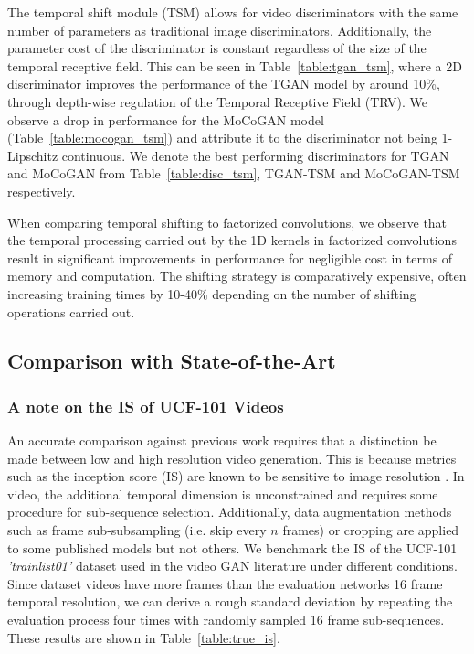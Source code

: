 \documentclass[a4paper,fleqn]{cas-sc}
\begin{document}
The temporal shift module (TSM) allows for video discriminators with the same number of parameters as traditional image discriminators. Additionally, the parameter cost of the discriminator is constant regardless of the size of the temporal receptive field. This can be seen in Table~\ref{table:tgan_tsm}, where a 2D discriminator improves the performance of the TGAN model by around 10\%, through depth-wise regulation of the Temporal Receptive Field (TRV). We observe a drop in performance for the MoCoGAN model (Table~\ref{table:mocogan_tsm}) and attribute it to the discriminator not being 1-Lipschitz continuous. We denote the best performing discriminators for TGAN and MoCoGAN from Table~\ref{table:disc_tsm}, TGAN-TSM and MoCoGAN-TSM respectively.

When comparing temporal shifting to factorized convolutions, we observe that the temporal processing carried out by the 1D kernels in factorized convolutions result in significant improvements in performance for negligible cost in terms of memory and computation. The shifting strategy is comparatively expensive, often increasing training times by 10-40\% depending on the number of shifting operations carried out.

\subsection{Comparison with State-of-the-Art}
\label{sec:sota}

\subsubsection{A note on the IS of UCF-101 Videos}
An accurate comparison against previous work requires that a distinction be made between low and high resolution video generation. This is because metrics such as the inception score (IS) are known to be sensitive to image resolution \cite{brockDS2018large,BORJI201941}. In video, the additional temporal dimension is unconstrained and requires some procedure for sub-sequence selection. Additionally, data augmentation methods such as frame sub-subsampling (i.e. skip every $n$ frames) or cropping are applied to some published models but not others. We benchmark the IS of the UCF-101 \textit{'trainlist01'} dataset used in the video GAN literature under different conditions. Since dataset videos have more frames than the evaluation networks 16 frame temporal resolution, we can derive a rough standard deviation by repeating the evaluation process four times with randomly sampled 16 frame sub-sequences. These results are shown in Table~\ref{table:true_is}. 
\end{document}
